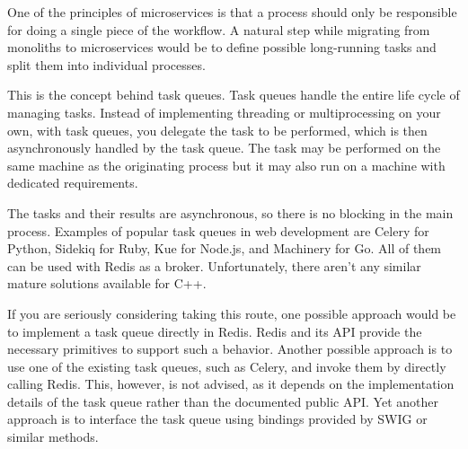 
One of the principles of microservices is that a process should only be responsible for doing a single piece of the workflow. A natural step while migrating from monoliths to microservices would be to define possible long-running tasks and split them into individual processes.

This is the concept behind task queues. Task queues handle the entire life cycle of managing tasks. Instead of implementing threading or multiprocessing on your own, with task queues, you delegate the task to be performed, which is then asynchronously handled by the task queue. The task may be performed on the same machine as the originating process but it may also run on a machine with dedicated requirements.

The tasks and their results are asynchronous, so there is no blocking in the main process. Examples of popular task queues in web development are Celery for Python, Sidekiq for Ruby, Kue for Node.js, and Machinery for Go. All of them can be used with Redis as a broker. Unfortunately, there aren't any similar mature solutions available for C++.

If you are seriously considering taking this route, one possible approach would be to implement a task queue directly in Redis. Redis and its API provide the necessary primitives to support such a behavior. Another possible approach is to use one of the existing task queues, such as Celery, and invoke them by directly calling Redis. This, however, is not advised, as it depends on the implementation details of the task queue rather than the documented public API. Yet another approach is to interface the task queue using bindings provided by SWIG or similar methods.



















